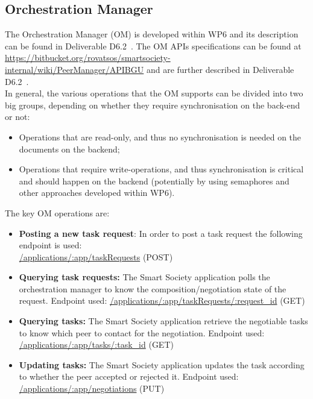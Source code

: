 \subsection{Orchestration Manager}
The Orchestration Manager (OM) is developed within WP6 and its description
can be found in  Deliverable D6.2~\cite{D6.2}. The OM APIs specifications can be found at
\url{https://bitbucket.org/rovatsos/smartsociety-internal/wiki/PeerManager/APIBGU}
and are further described in Deliverable D6.2~\cite{D6.2}. \\
In general, the various operations that the OM supports can be divided
into two big groups, depending on whether they require synchronisation
on the back-end or not:
\begin{itemize}
\item Operations that are read-only, and thus no synchronisation is
  needed on the documents on the backend;\
\item Operations that require write-operations, and thus
  synchronisation is critical and should happen on the backend
  (potentially by using semaphores and other approaches developed
  within WP6).
\end{itemize}
The key OM operations are:
\begin{itemize}
\item {\bf Posting a new task request}: In order to post a task request the following endpoint is used:\\
	\url{/applications/:app/taskRequests} (\textsc{POST})
\item {\bf Querying task requests:} The Smart Society application polls the orchestration manager to know the composition/negotiation state of the request. Endpoint used:
  \url{/applications/:app/taskRequests/:request_id} (\textsc{GET})
\item {\bf Querying tasks:} The Smart Society application retrieve the negotiable tasks to know which peer to contact for the negotiation. Endpoint used:
  \url{/applications/:app/tasks/:task_id} (\textsc{GET})
\item {\bf Updating tasks:} The Smart Society application updates the task according to whether the peer accepted or rejected it. Endpoint used:
  \url{/applications/:app/negotiations} (\textsc{PUT})
\end{itemize}
